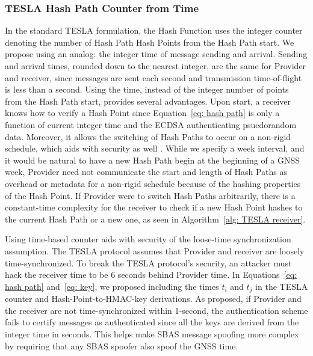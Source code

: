 \documentclass[letterpaper,times]{IONconf/IONconf}
\begin{document}
		\subsubsection{TESLA Hash Path Counter from Time} \label{subsub:time_counter}

			In the standard TESLA formulation, the Hash Function uses the integer counter denoting the number of Hash Path Hash Points from the Hash Path start.
			We propose using an analog: the integer time of message sending and arrival.
			Sending and arrival times, rounded down to the nearest integer, are the same for Provider and receiver, since messages are sent each second and transmission time-of-flight is less than a second.
			Using the time, instead of the integer number of points from the Hash Path start, provides several advantages.
			Upon start, a receiver knows how to verify a Hash Point since Equation~\eqref{eq: hash path} is only a function of current integer time and the ECDSA authenticating psuedorandom data.
			Moreover, it allows the switching of Hash Paths to occur on a non-rigid schedule, which aids with security as well \cite{chain-security}.
			While we specify a week interval, and it would be natural to have a new Hash Path begin at the beginning of a GNSS week, Provider need not communicate the start and length of Hash Paths as overhead or metadata for a non-rigid schedule because of the hashing properties of the Hash Point.
			If Provider were to switch Hash Paths arbitrarily, there is a constant-time complexity for the receiver to check if a new Hash Point hashes to the current Hash Path or a new one, as seen in Algorithm~\ref{alg: TESLA receiver}.

			Using time-based counter aids with security of the loose-time synchronization assumption.
			The TESLA protocol assumes that Provider and receiver are loosely time-synchronized.
			To break the TESLA protocol's security, an attacker must hack the receiver time to be 6 seconds behind Provider time.
			In Equations~\eqref{eq: hash path} and~\eqref{eq: key}, we proposed including the times $t_i$ and $t_j$ in the TESLA counter and Hash-Point-to-HMAC-key derivations.
			As proposed, if Provider and the receiver are not time-synchronized within 1-second, the authentication scheme fails to certify messages as authenticated since all the keys are derived from the integer time in seconds.
			This helps make SBAS message spoofing more complex by requiring that any SBAS spoofer also spoof the GNSS time.
\end{document}
